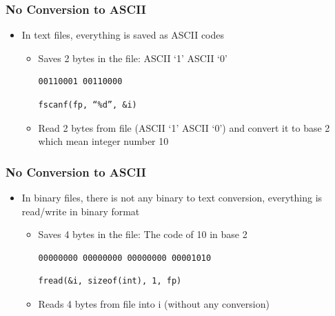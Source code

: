 \documentclass{../c-lecture}
\begin{document}
\begin{frame}[fragile]
  \frametitle{No Conversion to ASCII}
  \begin{itemize}
    \item In text files, everything is saved as ASCII codes
    \begin{itemize}
      \begin{verbatim}
fprintf(fp, “%d”, 10)
      \end{verbatim}
      \item Saves 2 bytes in the file: ASCII ‘1’ ASCII ‘0’
      \begin{verbatim}
00110001 00110000
      \end{verbatim}
      \begin{verbatim}
fscanf(fp, “%d”, &i)
      \end{verbatim}
      \item
        Read 2 bytes from file (ASCII ‘1’ ASCII ‘0’) and convert it to base 2
        which mean integer number 10

    \end{itemize}
  \end{itemize}
\end{frame}
\begin{frame}[fragile]
  \frametitle{No Conversion to ASCII}
  \begin{itemize}
    \item
      In binary files, there is not any binary to text conversion, everything
      is read/write in binary format

    \begin{itemize}
      \begin{verbatim}
int i = 10;
fwrite(&i, sizeof(int), 1, fp)
      \end{verbatim}
      \item Saves 4 bytes in the file: The code of 10 in base 2
      \begin{verbatim}
00000000 00000000 00000000 00001010
      \end{verbatim}
      \begin{verbatim}
fread(&i, sizeof(int), 1, fp)
      \end{verbatim}
      \item Reads 4 bytes from file into i (without any conversion)
    \end{itemize}
  \end{itemize}
\end{frame}
\end{document}
